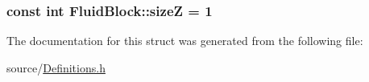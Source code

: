 \subsubsection[{size\+Z}]{\setlength{\rightskip}{0pt plus 5cm}const int Fluid\+Block\+::size\+Z = 1\hspace{0.3cm}{\ttfamily [static]}}\label{struct_fluid_block_a7876602d8791ed7d4734fa20ad0a9574}


The documentation for this struct was generated from the following file\+:\begin{DoxyCompactItemize}
\item 
source/\hyperlink{_definitions_8h}{Definitions.\+h}\end{DoxyCompactItemize}

